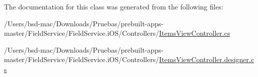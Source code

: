 The documentation for this class was generated from the following files\+:\begin{DoxyCompactItemize}
\item 
/\+Users/bsd-\/mac/\+Downloads/\+Pruebas/prebuilt-\/apps-\/master/\+Field\+Service/\+Field\+Service.\+i\+O\+S/\+Controllers/\hyperlink{_items_view_controller_8cs}{Items\+View\+Controller.\+cs}\item 
/\+Users/bsd-\/mac/\+Downloads/\+Pruebas/prebuilt-\/apps-\/master/\+Field\+Service/\+Field\+Service.\+i\+O\+S/\+Controllers/\hyperlink{_items_view_controller_8designer_8cs}{Items\+View\+Controller.\+designer.\+cs}\end{DoxyCompactItemize}
